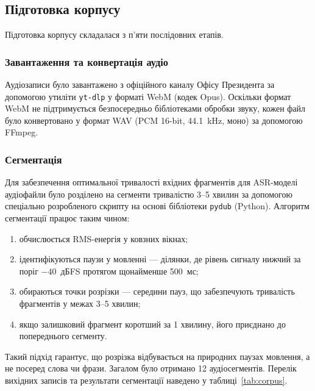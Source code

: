 \subsection{Підготовка корпусу}
\label{subsec:corpus_prep}

Підготовка корпусу складалася з п'яти послідовних етапів.

\subsubsection{Завантаження та конвертація аудіо}

Аудіозаписи було завантажено з офіційного каналу Офісу Президента за допомогою утиліти \texttt{yt-dlp} у форматі WebM (кодек Opus).
Оскільки формат WebM не підтримується безпосередньо бібліотеками обробки
звуку, кожен файл було конвертовано у формат WAV (PCM 16-bit, 44.1~kHz, моно)
за допомогою FFmpeg.

\subsubsection{Сегментація}

Для забезпечення оптимальної тривалості вхідних фрагментів для ASR-моделі
аудіофайли було розділено на сегменти тривалістю 3--5 хвилин за допомогою
спеціально розробленого скрипту на основі бібліотеки \texttt{pydub} (Python).
Алгоритм сегментації працює таким чином:
\begin{enumerate}[nosep]
    \item обчислюється RMS-енергія у ковзних вікнах;
    \item ідентифікуються паузи у мовленні --- ділянки, де рівень сигналу
    нижчий за поріг $-40$~дБFS протягом щонайменше 500~мс;
    \item обираються точки розрізки --- середини пауз, що забезпечують
    тривалість фрагментів у межах 3--5 хвилин;
    \item якщо залишковий фрагмент коротший за 1 хвилину, його приєднано
    до попереднього сегменту.
\end{enumerate}

Такий підхід гарантує, що розрізка відбувається на природних паузах мовлення,
а не посеред слова чи фрази. Загалом було отримано 12 аудіосегментів.
Перелік вихідних записів та результати сегментації наведено у
таблиці~\ref{tab:corpus}.

